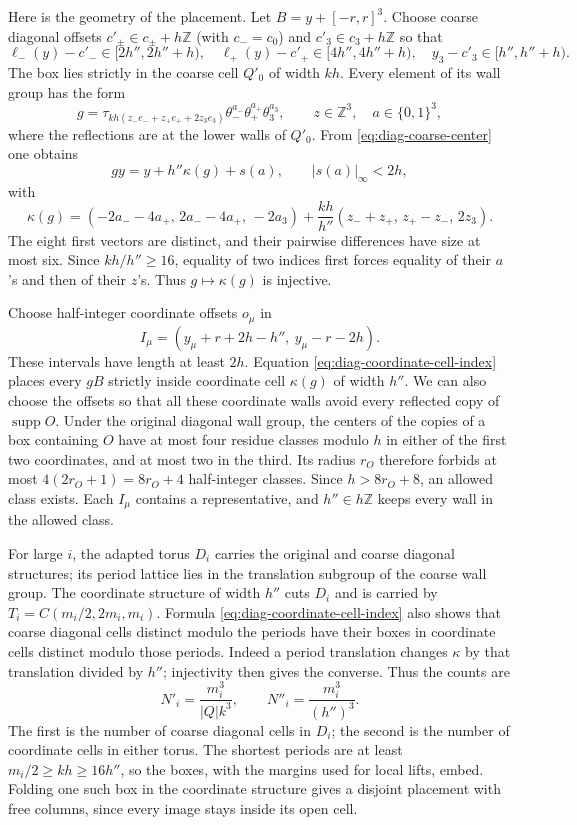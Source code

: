 \documentclass[11pt,letterpaper,reqno]{amsart}
\newcommand{\Z}{\mathbb Z}
\DeclareMathOperator{\supp}{supp}
\begin{document}
Here is the geometry of the placement. Let $B=y+[-r,r]^3$. Choose
coarse diagonal offsets $c'_\pm\in c_\pm+h\Z$ (with
$c_-=c_0$) and $c'_3\in c_3+h\Z$ so that
\begin{equation}\label{eq:diag-coarse-center}
 \ell_-(y)-c'_-\in[2h'',2h''+h),\quad
 \ell_+(y)-c'_+\in[4h'',4h''+h),\quad
 y_3-c'_3\in[h'',h''+h).
\end{equation}
The box lies strictly in the coarse cell $Q'_0$ of width $kh$.
Every element of its wall group has the form
\[
 g=\tau_{kh(z_-e_-+z_+e_++2z_3e_3)}
            \theta_-^{a_-}\theta_+^{a_+}\theta_3^{a_3},
 \qquad z\in\Z^3,\quad a\in\{0,1\}^3,
\]
where the reflections are at the lower walls of $Q'_0$. From
\eqref{eq:diag-coarse-center} one obtains
\begin{equation}\label{eq:diag-coordinate-cell-index}
 gy=y+h''\kappa(g)+s(a),\qquad |s(a)|_\infty<2h,
\end{equation}
with
\[
 \kappa(g)=(-2a_--4a_+,\,2a_--4a_+,\,-2a_3)
       +\frac{kh}{h''}(z_-+z_+,\,z_+-z_-,\,2z_3).
\]
The eight first vectors are distinct, and their pairwise
differences have size at most six. Since $kh/h''\ge16$, equality
of two indices first forces equality of their $a$'s and then of
their $z$'s. Thus $g\mapsto\kappa(g)$ is injective.

Choose half-integer coordinate offsets $o_\mu$ in
\[
 I_\mu=(y_\mu+r+2h-h'',\ y_\mu-r-2h).
\]
These intervals have length at least $2h$. Equation
\eqref{eq:diag-coordinate-cell-index} places every $gB$ strictly
inside coordinate cell $\kappa(g)$ of width $h''$. We can also
choose the offsets so that all these coordinate walls avoid
every reflected copy of $\supp O$. Under the original diagonal
wall group, the centers of the copies of a box containing $O$
have at most four residue classes modulo $h$ in either of the
first two coordinates, and at most two in the third. Its radius
$r_O$ therefore forbids at most $4(2r_O+1)=8r_O+4$ half-integer
classes. Since $h>8r_O+8$, an allowed class exists. Each $I_\mu$
contains a representative, and $h''\in h\Z$ keeps every wall
in the allowed class.

For large $i$, the adapted torus $D_i$ carries the original and
coarse diagonal structures; its period lattice lies in the
translation subgroup of the coarse wall group. The coordinate
structure of width $h''$ cuts $D_i$ and is carried by
$T_i=C(m_i/2,2m_i,m_i)$. Formula
\eqref{eq:diag-coordinate-cell-index} also shows that coarse
diagonal cells distinct modulo the periods have their boxes in
coordinate cells distinct modulo those periods. Indeed a period
translation changes $\kappa$ by that translation divided by
$h''$; injectivity then gives the converse. Thus the counts are
\begin{equation}\label{eq:diag-coarse-cell-counts}
 N'_i=\frac{m_i^3}{|Q|k^3},\qquad
 N''_i=\frac{m_i^3}{(h'')^3}.
\end{equation}
The first is the number of coarse diagonal cells in $D_i$; the
second is the number of coordinate cells in either torus. The
shortest periods are at least $m_i/2\ge kh\ge16h''$, so the
boxes, with the margins used for local lifts, embed. Folding
one such box in the coordinate structure gives a disjoint
placement with free columns, since every image stays inside
its open cell.
\end{document}
